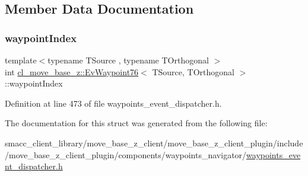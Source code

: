 \subsection{Member Data Documentation}
\mbox{\label{structcl__move__base__z_1_1EvWaypoint76_a6f05c74b7ebcab38d88bf960f27bdd9a}} 
\subsubsection{\texorpdfstring{waypoint\+Index}{waypointIndex}}
{\footnotesize\ttfamily template$<$typename T\+Source , typename T\+Orthogonal $>$ \\
int \hyperlink{structcl__move__base__z_1_1EvWaypoint76}{cl\+\_\+move\+\_\+base\+\_\+z\+::\+Ev\+Waypoint76}$<$ T\+Source, T\+Orthogonal $>$\+::waypoint\+Index}



Definition at line 473 of file waypoints\+\_\+event\+\_\+dispatcher.\+h.



The documentation for this struct was generated from the following file\+:\begin{DoxyCompactItemize}
\item 
smacc\+\_\+client\+\_\+library/move\+\_\+base\+\_\+z\+\_\+client/move\+\_\+base\+\_\+z\+\_\+client\+\_\+plugin/include/move\+\_\+base\+\_\+z\+\_\+client\+\_\+plugin/components/waypoints\+\_\+navigator/\hyperlink{waypoints__event__dispatcher_8h}{waypoints\+\_\+event\+\_\+dispatcher.\+h}\end{DoxyCompactItemize}
